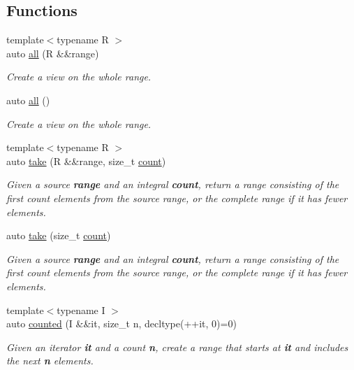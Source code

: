 \subsection*{Functions}
\begin{DoxyCompactItemize}
\item 
{\footnotesize template$<$typename R $>$ }\\auto \mbox{\hyperlink{namespacerah_1_1view_acc7f1420accc862d2ac433ba9c697e95}{all}} (R \&\&range)
\begin{DoxyCompactList}\small\item\em Create a view on the whole range. \end{DoxyCompactList}\item 
auto \mbox{\hyperlink{namespacerah_1_1view_aeed660f7f6a4e0fbefffa4e42de7642a}{all}} ()
\begin{DoxyCompactList}\small\item\em Create a view on the whole range. \end{DoxyCompactList}\item 
{\footnotesize template$<$typename R $>$ }\\auto \mbox{\hyperlink{namespacerah_1_1view_abf061092d9ba17f35fb1ca63eed50d9a}{take}} (R \&\&range, size\+\_\+t \mbox{\hyperlink{namespacerah_aa528865cc4a45d4eb276329554f16b4b}{count}})
\begin{DoxyCompactList}\small\item\em Given a source {\bfseries{range}} and an integral {\bfseries{count}}, return a range consisting of the first count elements from the source range, or the complete range if it has fewer elements. \end{DoxyCompactList}\item 
auto \mbox{\hyperlink{namespacerah_1_1view_ad0ee883cff948aff77ad05a26dad0f92}{take}} (size\+\_\+t \mbox{\hyperlink{namespacerah_aa528865cc4a45d4eb276329554f16b4b}{count}})
\begin{DoxyCompactList}\small\item\em Given a source {\bfseries{range}} and an integral {\bfseries{count}}, return a range consisting of the first count elements from the source range, or the complete range if it has fewer elements. \end{DoxyCompactList}\item 
{\footnotesize template$<$typename I $>$ }\\auto \mbox{\hyperlink{namespacerah_1_1view_a9ea4acac3be1e0c4bf367c61a5252653}{counted}} (I \&\&it, size\+\_\+t n, decltype(++it, 0)=0)
\begin{DoxyCompactList}\small\item\em Given an iterator {\bfseries{it}} and a count {\bfseries{n}}, create a range that starts at {\bfseries{it}} and includes the next {\bfseries{n}} elements. \end{DoxyCompactList}\item 

\end{DoxyCompactItemize}
